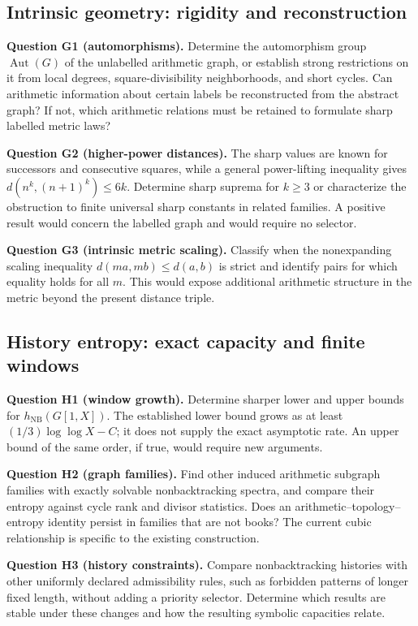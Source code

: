 \documentclass[11pt,a4paper]{article}
\theoremstyle{definition}\newtheorem{definition}[theorem]{Definition}
\newcommand{\NB}{\mathrm{NB}}
\begin{document}
\subsection{Intrinsic geometry: rigidity and reconstruction}
\textbf{Question G1 (automorphisms).} Determine the automorphism group $\operatorname{Aut}(G)$ of the unlabelled arithmetic graph, or establish strong restrictions on it from local degrees, square-divisibility neighborhoods, and short cycles. Can arithmetic information about certain labels be reconstructed from the abstract graph? If not, which arithmetic relations must be retained to formulate sharp labelled metric laws?

\textbf{Question G2 (higher-power distances).} The sharp values are known for successors and consecutive squares, while a general power-lifting inequality gives $d(n^k,(n+1)^k)\le6k$. Determine sharp suprema for $k\ge3$ or characterize the obstruction to finite universal sharp constants in related families. A positive result would concern the labelled graph and would require no selector.

\textbf{Question G3 (intrinsic metric scaling).} Classify when the nonexpanding scaling inequality $d(ma,mb)\le d(a,b)$ is strict and identify pairs for which equality holds for all $m$. This would expose additional arithmetic structure in the metric beyond the present distance triple.

\subsection{History entropy: exact capacity and finite windows}
\textbf{Question H1 (window growth).} Determine sharper lower and upper bounds for $h_{\NB}(G[1,X])$. The established lower bound grows as at least $(1/3)\log\log X-C$; it does not supply the exact asymptotic rate. An upper bound of the same order, if true, would require new arguments.

\textbf{Question H2 (graph families).} Find other induced arithmetic subgraph families with exactly solvable nonbacktracking spectra, and compare their entropy against cycle rank and divisor statistics. Does an arithmetic--topology--entropy identity persist in families that are not books? The current cubic relationship is specific to the existing construction.

\textbf{Question H3 (history constraints).} Compare nonbacktracking histories with other uniformly declared admissibility rules, such as forbidden patterns of longer fixed length, without adding a priority selector. Determine which results are stable under these changes and how the resulting symbolic capacities relate.
\end{document}

